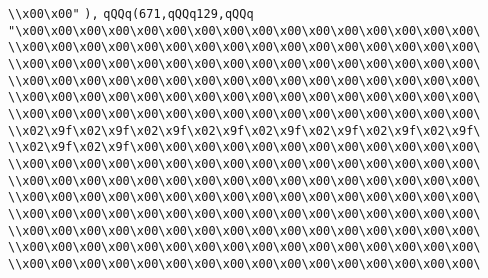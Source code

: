 \verb|\\x00\x00"|\newline
\verb|),|\newline
\verb|qQQq(671,qQQq129,qQQq|\newline
\verb|"\x00\x00\x00\x00\x00\x00\x00\x00\x00\x00\x00\x00\x00\x00\x00\x00\|\newline
\verb|\\x00\x00\x00\x00\x00\x00\x00\x00\x00\x00\x00\x00\x00\x00\x00\x00\|\newline
\verb|\\x00\x00\x00\x00\x00\x00\x00\x00\x00\x00\x00\x00\x00\x00\x00\x00\|\newline
\verb|\\x00\x00\x00\x00\x00\x00\x00\x00\x00\x00\x00\x00\x00\x00\x00\x00\|\newline
\verb|\\x00\x00\x00\x00\x00\x00\x00\x00\x00\x00\x00\x00\x00\x00\x00\x00\|\newline
\verb|\\x00\x00\x00\x00\x00\x00\x00\x00\x00\x00\x00\x00\x00\x00\x00\x00\|\newline
\verb|\\x02\x9f\x02\x9f\x02\x9f\x02\x9f\x02\x9f\x02\x9f\x02\x9f\x02\x9f\|\newline
\verb|\\x02\x9f\x02\x9f\x00\x00\x00\x00\x00\x00\x00\x00\x00\x00\x00\x00\|\newline
\verb|\\x00\x00\x00\x00\x00\x00\x00\x00\x00\x00\x00\x00\x00\x00\x00\x00\|\newline
\verb|\\x00\x00\x00\x00\x00\x00\x00\x00\x00\x00\x00\x00\x00\x00\x00\x00\|\newline
\verb|\\x00\x00\x00\x00\x00\x00\x00\x00\x00\x00\x00\x00\x00\x00\x00\x00\|\newline
\verb|\\x00\x00\x00\x00\x00\x00\x00\x00\x00\x00\x00\x00\x00\x00\x00\x00\|\newline
\verb|\\x00\x00\x00\x00\x00\x00\x00\x00\x00\x00\x00\x00\x00\x00\x00\x00\|\newline
\verb|\\x00\x00\x00\x00\x00\x00\x00\x00\x00\x00\x00\x00\x00\x00\x00\x00\|\newline
\verb|\\x00\x00\x00\x00\x00\x00\x00\x00\x00\x00\x00\x00\x00\x00\x00\x00\|\newline
